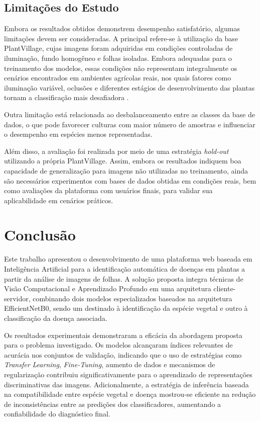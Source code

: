 \documentclass[portuguese]{sbc2025}%
\begin{document}
\subsection{Limitações do Estudo}

Embora os resultados obtidos demonstrem desempenho satisfatório, algumas limitações devem ser consideradas. A principal refere-se à 
utilização da base PlantVillage, cujas imagens foram adquiridas em condições controladas de iluminação, fundo homogêneo e folhas 
isoladas. Embora adequadas para o treinamento dos modelos, essas condições não representam integralmente os cenários encontrados 
em ambientes agrícolas reais, nos quais fatores como iluminação variável, oclusões e diferentes estágios de desenvolvimento das 
plantas tornam a classificação mais desafiadora \citep{ref2,ref3,ref17}.

Outra limitação está relacionada ao desbalanceamento entre as classes da base de dados, o que pode favorecer culturas com maior número 
de amostras e influenciar o desempenho em espécies menos representadas.

Além disso, a avaliação foi realizada por meio de uma estratégia \textit{hold-out} utilizando a própria PlantVillage. Assim, embora os 
resultados indiquem boa capacidade de generalização para imagens não utilizadas no treinamento, ainda são necessários experimentos com 
bases de dados obtidas em condições reais, bem como avaliações da plataforma com usuários finais, para validar sua aplicabilidade 
em cenários práticos.

\section{Conclusão}

Este trabalho apresentou o desenvolvimento de uma plataforma web baseada em Inteligência Artificial para a identificação automática de 
doenças em plantas a partir da análise de imagens de folhas. A solução proposta integra técnicas de Visão Computacional e Aprendizado 
Profundo em uma arquitetura cliente-servidor, combinando dois modelos especializados baseados na arquitetura EfficientNetB0, sendo um 
destinado à identificação da espécie vegetal e outro à classificação da doença associada.

Os resultados experimentais demonstraram a eficácia da abordagem proposta para o problema investigado. Os modelos alcançaram índices 
relevantes de acurácia nos conjuntos de validação, indicando que o uso de estratégias como \textit{Transfer Learning}, 
\textit{Fine-Tuning}, aumento de dados e mecanismos de regularização contribuiu significativamente para o aprendizado de representações
discriminativas das imagens. Adicionalmente, a estratégia de inferência baseada na compatibilidade entre espécie vegetal e doença 
mostrou-se eficiente na redução de inconsistências entre as predições dos classificadores, aumentando a confiabilidade do diagnóstico
final.
\end{document}
